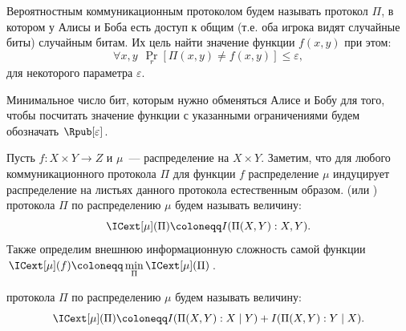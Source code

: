 






\begin{definition*}
     Вероятностным коммуникационным протоколом будем называть протокол $\Pi$, в
    котором у Алисы и Боба есть доступ к общим (т.е. оба игрока видят случайные биты) случайным битам. Их
    цель найти значение функции $f(x, y)$ при этом:
    $$
        \forall x, y ~~ \Pr\limits_{r}[\Pi(x, y) \neq f(x, y)] \le \varepsilon,
    $$
    для некоторого параметра $\varepsilon$.

    Минимальное число бит, которым нужно обменяться Алисе и Бобу для того, чтобы посчитать значение
    функции с указанными ограничениями будем обозначать $\Rpub[\varepsilon]$.
\end{definition*}


\begin{definition*}
    Пусть $f\colon X \times Y \to Z$ и $\mu$~--- распределение на $X \times Y$. Заметим, что для любого
    коммуникационного протокола $\Pi$ для функции $f$ распределение $\mu$ индуцирует распределение на
    листьях данного протокола естественным образом.  (или
    ) протокола $\Pi$ по распределению $\mu$ будем называть
    величину:
    $$\ICext[\mu](\Pi) \coloneqq I(\Pi(X, Y) : X, Y).$$
    Также определим внешнюю информационную сложность самой функции
    $\ICext[\mu](f) \coloneqq \min\limits_{\Pi} \ICext[\mu](\Pi)$.

     протокола $\Pi$ по распределению $\mu$ будем называть
    величину:
    $$\ICext[\mu](\Pi) \coloneqq I(\Pi(X, Y) : X \mid Y) + I(\Pi(X, Y) : Y \mid X).$$
\end{definition*}

